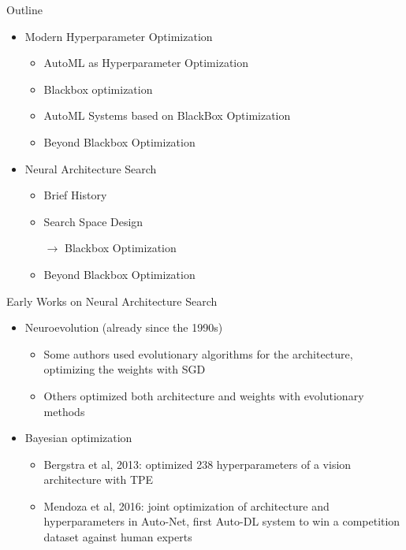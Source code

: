 \begin{frame}[c]{Outline}
\begin{itemize}
	\item Modern Hyperparameter Optimization
	\begin{itemize}
		\item AutoML as Hyperparameter Optimization
		\item Blackbox optimization
		\item AutoML Systems based on BlackBox Optimization
		\item Beyond Blackbox Optimization 
	\end{itemize}
	\item Neural Architecture Search
	\begin{itemize}
		\item Brief History
		\item Search Space Design
		\item[$\to$] Blackbox Optimization
		\item Beyond Blackbox Optimization
	\end{itemize}
\end{itemize}
\end{frame}
\begin{frame}[c]{Early Works on Neural Architecture Search}
\begin{itemize}
	\item Neuroevolution (already since the 1990s)
	\begin{itemize}
		\item Some authors used evolutionary algorithms for the
		architecture, optimizing the weights with SGD
		\item Others optimized both architecture and weights with
		evolutionary methods
	\end{itemize}
	\item Bayesian optimization
	\begin{itemize}
		\item Bergstra et al, 2013: optimized 238 hyperparameters of a vision
		architecture with TPE
		\item Mendoza et al, 2016: joint optimization of architecture and
		hyperparameters in Auto-Net, first Auto-DL system to win a
		competition dataset against human experts
	\end{itemize}
\end{itemize}
\end{frame}
